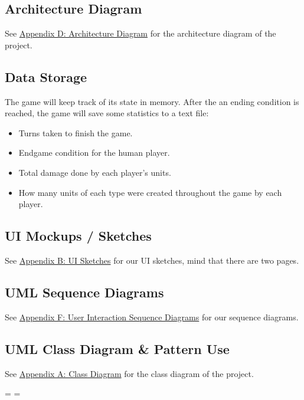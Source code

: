 \documentclass[11pt]{amsart}
\begin{document}
\subsection*{Architecture Diagram} \phantom{}
See \hyperref[sec:appendixd]{Appendix D: Architecture Diagram} for the architecture diagram of the project.

\subsection*{Data Storage} \phantom{}

The game will keep track of its state in memory. After the an ending condition is reached, the game will save some statistics to a text file:
\begin{itemize}
    \item Turns taken to finish the game.
    \item Endgame condition for the human player.
    \item Total damage done by each player's units.
    \item How many units of each type were created throughout the game by each player.
\end{itemize}

\subsection*{UI Mockups / Sketches} \phantom{}
See \hyperref[sec:appendixb]{Appendix B: UI Sketches} for our UI sketches, mind that there are two pages.

\subsection*{UML Sequence Diagrams} \phantom{}
See \hyperref[sec:appendixf]{Appendix F: User Interaction Sequence Diagrams} for our sequence diagrams.
\subsection*{UML Class Diagram \& Pattern Use} \phantom{}
See \hyperref[sec:appendixa]{Appendix A: Class Diagram} for the class diagram of the project.


\newpage
\paperwidth=20in
\paperheight=10in
\pdfpagewidth=\paperwidth
\pdfpageheight=\paperheight


\end{document}
